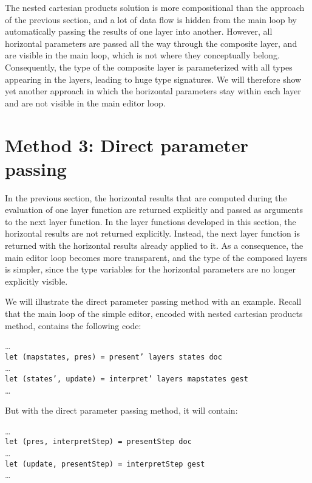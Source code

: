 The nested cartesian products solution is more compositional than the approach of the previous section, and a lot of data flow is hidden from the main loop by automatically passing the results of one layer into another. However, all horizontal parameters are passed all the way through the composite layer, and are visible in the main loop, which is not where they conceptually belong. Consequently, the type of the composite layer is parameterized with all types appearing in the layers, leading to huge type signatures. We will therefore show yet another approach in which the horizontal parameters stay within each layer and are not visible in the main editor loop.


%																
%																
%																
\section{Method 3: Direct parameter passing} \label{sectdpp}
 
In the previous section, the horizontal results that are computed during the evaluation of one layer function are returned explicitly and passed as arguments to the next layer function. In the layer functions developed in this section, the horizontal results are not returned explicitly.  Instead, the next layer function is returned with the horizontal results already applied to it. As a consequence, the main editor loop becomes more transparent, and the type of the composed layers is simpler, since the type variables for the horizontal parameters are no longer explicitly visible.

We will illustrate the direct parameter passing method with an example. Recall that the main loop of the simple editor, encoded with nested cartesian products method, contains the following code:

\dots\\
{\tt let (mapstates, pres) = present' layers states doc}\\
\dots\\
{\tt let (states', update) = interpret' layers mapstates gest}\\
\dots

But with the direct parameter passing method, it will contain:

\dots\\
{\tt let (pres, interpretStep) = presentStep doc}\\
\dots\\
{\tt let (update, presentStep) = interpretStep gest}\\
\dots

